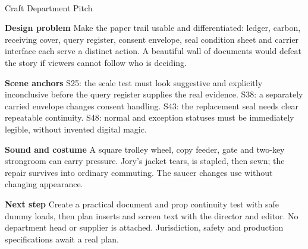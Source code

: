 \documentclass[11pt,letterpaper]{article}
\begin{document}
\begin{center}
{\Large\bfseries\sffamily \filmtitleupper}\\[6pt]
Craft Department Pitch
\end{center}
\textbf{Design problem} Make the paper trail usable and differentiated: ledger, carbon, receiving cover, query register, consent envelope, seal condition sheet and carrier interface each serve a distinct action. A beautiful wall of documents would defeat the story if viewers cannot follow who is deciding.

\textbf{Scene anchors} S25: the scale test must look suggestive and explicitly inconclusive before the query register supplies the real evidence. S38: a separately carried envelope changes consent handling. S43: the replacement seal needs clear repeatable continuity. S48: normal and exception statuses must be immediately legible, without invented digital magic.

\textbf{Sound and costume} A square trolley wheel, copy feeder, gate and two-key strongroom can carry pressure. Jory's jacket tears, is stapled, then sewn; the repair survives into ordinary commuting. The saucer changes use without changing appearance.

\textbf{Next step} Create a practical document and prop continuity test with safe dummy loads, then plan inserts and screen text with the director and editor. No department head or supplier is attached. Jurisdiction, safety and production specifications await a real plan.
\end{document}
